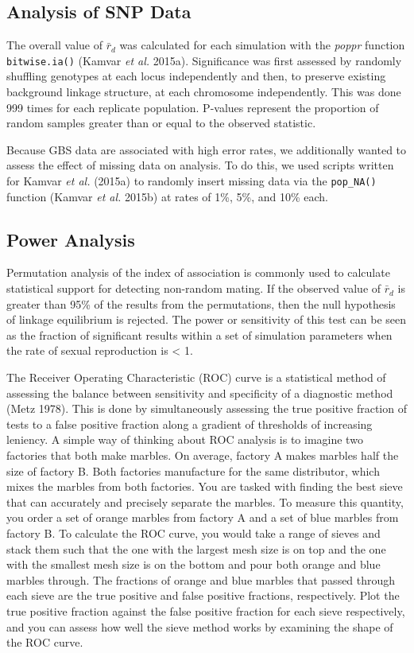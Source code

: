 \documentclass[]{article}
\theoremstyle{definition}
\theoremstyle{definition}
\theoremstyle{remark}
\begin{document}
\subsection{Analysis of SNP Data}\label{analysis-of-snp-data}

The overall value of \(\bar{r}_d\) was calculated for each simulation
with the \emph{poppr} function \texttt{bitwise.ia()} (Kamvar \emph{et
al.} 2015a). Significance was first assessed by randomly shuffling
genotypes at each locus independently and then, to preserve existing
background linkage structure, at each chromosome independently. This was
done 999 times for each replicate population. P-values represent the
proportion of random samples greater than or equal to the observed
statistic.

Because GBS data are associated with high error rates, we additionally
wanted to assess the effect of missing data on analysis. To do this, we
used scripts written for Kamvar \emph{et al.} (2015a) to randomly insert
missing data via the \texttt{pop\_NA()} function (Kamvar \emph{et al.}
2015b) at rates of 1\%, 5\%, and 10\% each.

\subsection{Power Analysis}\label{power-analysis}

Permutation analysis of the index of association is commonly used to
calculate statistical support for detecting non-random mating. If the
observed value of \(\bar{r}_d\) is greater than 95\% of the results from
the permutations, then the null hypothesis of linkage equilibrium is
rejected. The power or sensitivity of this test can be seen as the
fraction of significant results within a set of simulation parameters
when the rate of sexual reproduction is \textless{} 1.

The Receiver Operating Characteristic (ROC) curve is a statistical
method of assessing the balance between sensitivity and specificity of a
diagnostic method (Metz 1978). This is done by simultaneously assessing
the true positive fraction of tests to a false positive fraction along a
gradient of thresholds of increasing leniency. A simple way of thinking
about ROC analysis is to imagine two factories that both make marbles.
On average, factory A makes marbles half the size of factory B. Both
factories manufacture for the same distributor, which mixes the marbles
from both factories. You are tasked with finding the best sieve that can
accurately and precisely separate the marbles. To measure this quantity,
you order a set of orange marbles from factory A and a set of blue
marbles from factory B. To calculate the ROC curve, you would take a
range of sieves and stack them such that the one with the largest mesh
size is on top and the one with the smallest mesh size is on the bottom
and pour both orange and blue marbles through. The fractions of orange
and blue marbles that passed through each sieve are the true positive
and false positive fractions, respectively. Plot the true positive
fraction against the false positive fraction for each sieve
respectively, and you can assess how well the sieve method works by
examining the shape of the ROC curve.
\end{document}
